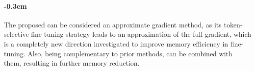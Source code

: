 \paragraph{\kern-0.3em}
The proposed \method can be considered an approximate gradient method, 
as its token-selective fine-tuning strategy leads to an approximation of the full gradient,
which is a completely new direction investigated to improve memory efficiency in fine-tuning.
Also, being complementary to prior methods, 
\method can be combined with them, resulting in further memory reduction.








